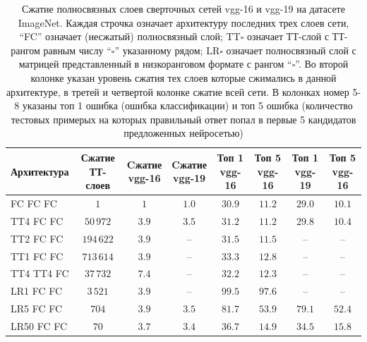 \begin{table}
    \begin{center}
    \begin{tabular}{ l@{\;}|@{\;}c@{\;}|@{\;}c@{\;}|@{\;}c@{\;}|@{\;}c@{\;}|@{\;}c@{\;}|@{\;}c@{\;}|@{\;}c@{\;} }
    Архитектура &
    \parbox{2cm}{Сжатие \\ ТТ-слоев} &
    \parbox{1.5cm}{Cжатие \\ vgg-16} &
    \parbox{1.5cm}{Cжатие \\ vgg-19} &
    \parbox{1.5cm}{Топ 1 \\ vgg-16} &
    \parbox{1.5cm}{Топ 5 \\ vgg-16} &
    \parbox{1.5cm}{Топ 1 \\ vgg-19} &
    \parbox{1.5cm}{Топ 5 \\ vgg-16} \rule{0pt}{1.0\normalbaselineskip} \\ \hline
    FC FC FC \rule{0pt}{1.0\normalbaselineskip}     & $1$ &  $1$ & $1.0$ & $30.9$ &  $11.2$ & $29.0$ & $10.1$  \\ %
    TT4 FC FC    & $50\,972$ & $3.9$ & $3.5$ & $31.2$ & $11.2$ & $29.8$ & $10.4$ \\ %
    TT2 FC FC    & $194\,622$ & $3.9$ & --  & $31.5$ & $11.5$ & -- & -- \\ %
    TT1 FC FC    & $713\,614$ & $3.9$ & --  & $33.3$ & $12.8$ & -- & -- \\ %
    TT4 TT4 FC    & $37\,732$ & $7.4$ & -- & $32.2$ & $12.3$ & -- & -- \\ %
    LR1 FC FC    & $3\,521$ & $3.9$ & -- & $99.5$ & $97.6$ & -- & -- \\ %
    LR5 FC FC    & $704$ & $3.9$ & $3.5$ & $81.7$ & $53.9$ & $79.1$ & $52.4$ \\ %
    LR50 FC FC    & $70$ & $3.7$ & $3.4$ & $36.7$ & $14.9$ & $34.5$ & $15.8$ \\ %
    \end{tabular}
    \end{center}
    \caption{Сжатие полносвязных слоев сверточных сетей  vgg-16 и vgg-19 на датасете ImageNet. Каждая строчка означает архитектуру последних трех слоев сети, ``FC'' означает (несжатый) полносвязный слой; TT$\square$ означает ТТ-слой с ТТ-рангом равным числу  ``$\square$'' указанному рядом; LR$\square$ означает полносвязный слой с матрицей представленный в низкоранговом формате с рангом ``$\square$''. Во второй колонке указан уровень сжатия тех слоев которые сжимались в данной архитектуре, в третей и четвертой колонке сжатие всей сети. В колонках номер 5-8 указаны топ 1 ошибка (ошибка классификации) и топ 5 ошибка (количество тестовых примерых на которых правильный ответ попал в первые 5 кандидатов предложенных нейросетью) \label{tbl:imagenet-vgg-layer}}
\end{table}

